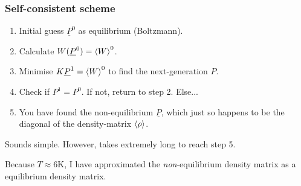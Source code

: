 \begin{frame}
    \frametitle{Self-consistent scheme}
    \begin{enumerate} 
    \item Initial guess $\underline{P}^0$ as equilibrium (Boltzmann).
    \item Calculate $W(\underline{P}^0) = \braket{W}^0$.
    \item Minimise $K \underline{P}^1 = \braket{W}^0$ to find the next-generation $P$.
    \item Check if $P^1 = P^0$. If not, return to step 2. Else...
    \item You have found the non-equilibrium $\underline{P}$, which just so happens to be the diagonal of the density-matrix $\braket{\rho}$.
    \end{enumerate} 
    
    Sounds simple. However, takes extremely long to reach step 5. 
    
    Because $T\approx 6$K, I have approximated the \emph{non}-equilibrium density matrix as a equilibrium density matrix. 
\end{frame}%
